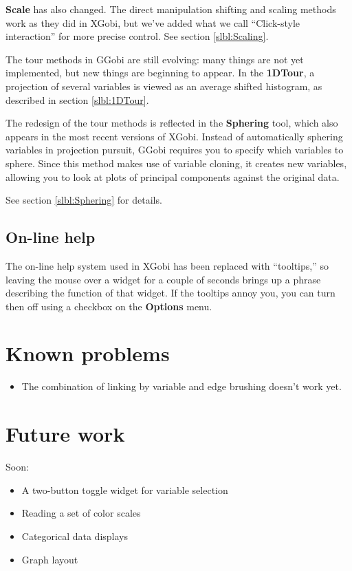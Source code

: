 \documentclass[11pt]{article}
\begin{document}
{\bf Scale} has also changed.  The direct manipulation shifting and
scaling methods work as they did in XGobi, but we've added what we
call ``Click-style interaction'' for more precise control.  See section
\ref{slbl:Scaling}.

The tour methods in GGobi are still evolving: many things are not yet
implemented, but new things are beginning to appear.  In the {\bf
1DTour}, a projection of several variables is viewed as an average
shifted histogram, as described in section \ref{slbl:1DTour}.

The redesign of the tour methods is reflected in the {\bf Sphering}
tool, which also appears in the most recent versions of XGobi.
Instead of automatically sphering variables in projection pursuit,
GGobi requires you to specify which variables to sphere.  Since this
method makes use of variable cloning, it creates new variables,
allowing you to look at plots of principal components against the
original data.

See section \ref{slbl:Sphering} for details.

\subsection{On-line help}

The on-line help system used in XGobi has been replaced with
``tooltips,'' so leaving the mouse over a widget for a couple of
seconds brings up a phrase describing the function of that widget.
If the tooltips annoy you, you can turn then off using a checkbox on
the {\bf Options} menu.

\section{Known problems}

\begin{itemize}
\item The combination of linking by variable and edge brushing
      doesn't work yet.
\end{itemize}

\section{Future work}

Soon:

\begin{itemize}
\item A two-button toggle widget for variable selection
\item Reading a set of color scales
\item Categorical data displays
\item Graph layout
\end{itemize}
\end{document}
